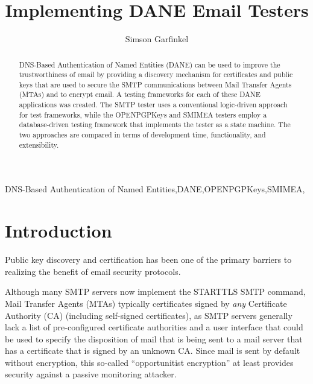 \documentclass[preprint,3p]{elsarticle}
\begin{document}
\begin{frontmatter}

\title{Implementing DANE Email Testers}

\author{Simson Garfinkel}

\begin{abstract}
DNS-Based Authentication of Named Entities (DANE) can be used to
improve the trustworthiness of email by providing a discovery
mechanism for certificates and public keys that are used to secure the  SMTP communications
between Mail Transfer Agents (MTAs) and to encrypt email. A testing
frameworks for each of these DANE applications was created. The SMTP
tester uses a conventional logic-driven approach for test
frameworks, while the OPENPGPKeys and SMIMEA testers employ a
database-driven testing framework that implements the tester as a
state machine. The two approaches are compared in terms of
development time, functionality, and extensibility.
\end{abstract}

\begin{keyword}
DNS-Based Authentication of Named Entities\sep DANE\sep OPENPGPKeys\sep SMIMEA\sep 
\end{keyword}

\end{frontmatter}

\tableofcontents


\section{Introduction}

Public key discovery and certification has been one of the primary
barriers to realizing the benefit of email security
protocols. 

Although many SMTP servers now implement the STARTTLS SMTP
command\cite{rfc3207}, Mail Transfer Agents (MTAs) typically
certificates signed by \emph{any} Certificate Authority (CA)
(including self-signed certificates), as SMTP servers generally lack a
list of pre-configured certificate authorities and a user interface
that could be used to specify the disposition of mail that is being
sent to a mail server that has a certificate that is signed by an
unknown CA. Since mail is sent by default without encryption, this
so-called ``opportunitist encryption'' at least provides security
against a passive monitoring attacker.
\end{document}
